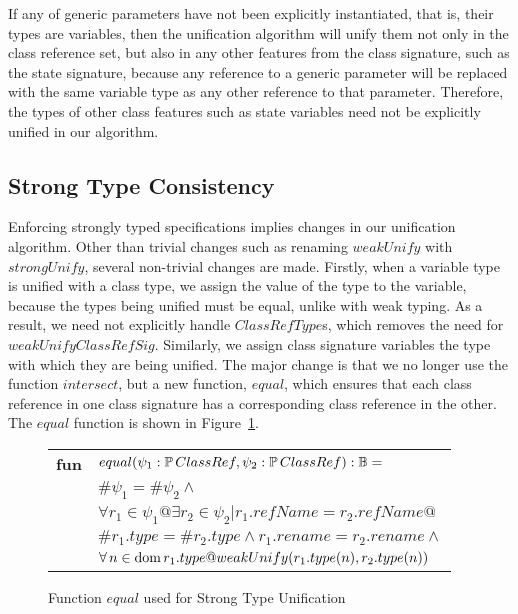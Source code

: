 If any of generic parameters have not been explicitly instantiated,
that is, their types are variables, then the unification algorithm
will unify them not only in the class reference set, but also in any
other features from the class signature, such as the state signature,
because any reference to a generic parameter will be replaced with the
same variable type as any other reference to that
parameter. Therefore, the types of other class features such as state
variables need not be explicitly unified in our algorithm.


\subsection{Strong Type Consistency}

Enforcing strongly typed specifications implies changes in our
unification algorithm. Other than trivial
changes such as renaming $weakUnify$ with $strongUnify$, several
non-trivial changes are made. Firstly, when a variable type is unified
with a class type, we assign the value of the type to the variable,
because the types being unified must be equal, unlike with weak
typing. As a result, we need not explicitly handle $ClassRefType$s,
which removes the need for $weakUnifyClassRefSig$. Similarly, we
assign class signature variables the type with which they are being
unified. The major change is that we no longer use the function
$intersect$, but a new function, $equal$, which ensures that each
class reference in one class signature has a corresponding class
reference in the other. The $equal$ function is shown in
Figure~\ref{equal-classref}.

\begin{figure}[t]
\begin{tabular}{ll}
  {\bf fun} & $equal(\psi_1:\power ClassRef, \psi_2:\power ClassRef) : \bool =$\\
   & \quad\quad$\#\psi_1 = \#\psi_2 \land$\\
   & \quad\quad$\forall r_1 \in \psi_1 @ \exists r_2 \in \psi_2 | r_1.refName = r_2.refName @$\\
   & \quad\quad\quad\quad $\#r_1.type = \#r_2.type \land r_1.rename = r_2.rename \land$\\
   & \quad\quad\quad\quad $\forall n \in \dom r_1.type @
       weakUnify(r_1.type(n), r_2.type(n))$
\end{tabular}
\caption{Function $equal$ used for Strong Type Unification}
\label{equal-classref}
\end{figure}

